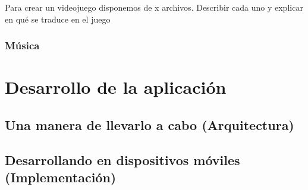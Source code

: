 Para crear un videojuego disponemos de x archivos.
Describir cada uno y explicar en qué se traduce en el juego

\subsection{Música}

\chapter{Desarrollo de la aplicación}

\section{Una manera de llevarlo a cabo (Arquitectura)}

\section{Desarrollando en dispositivos móviles (Implementación)}